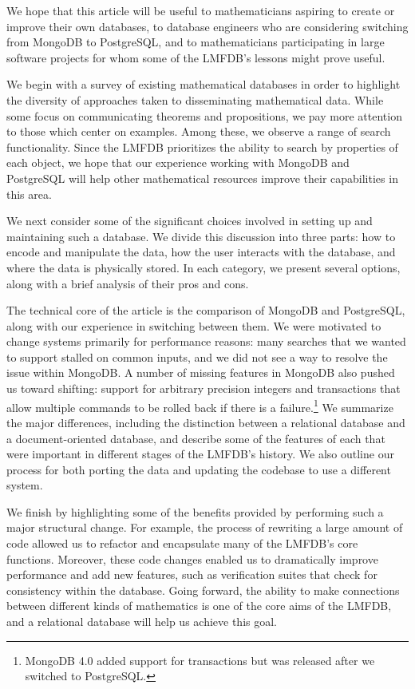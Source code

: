 \documentclass{amsart}
\begin{document}
We hope that this article will be useful to mathematicians aspiring to create or improve their own databases, to database engineers who are considering switching from MongoDB to PostgreSQL, and to mathematicians participating in large software projects for whom some of the LMFDB's lessons might prove useful.

We begin with a survey of existing mathematical databases in order to highlight the diversity of approaches taken to disseminating mathematical data.
While some focus on communicating theorems and propositions, we pay more attention to those which center on examples.
Among these, we observe a range of search functionality.
Since the LMFDB prioritizes the ability to search by properties of each object, we hope that our experience working with MongoDB and PostgreSQL will help other mathematical resources improve their capabilities in this area.

We next consider some of the significant choices involved in setting up and maintaining such a database.
We divide this discussion into three parts: how to encode and manipulate the data, how the user interacts with the database, and where the data is physically stored.
In each category, we present several options, along with a brief analysis of their pros and cons.

The technical core of the article is the comparison of MongoDB and PostgreSQL, along with our experience in switching between them.
We were motivated to change systems primarily for performance reasons: many searches that we wanted to support stalled on common inputs, and we did not see a way to resolve the issue within MongoDB.
A number of missing features in MongoDB also pushed us toward shifting: support for arbitrary precision integers and transactions that allow multiple commands to be rolled back if there is a failure.\footnote{MongoDB 4.0 added support for transactions but was released after we switched to PostgreSQL.}
We summarize the major differences, including the distinction between a relational database and a document-oriented database, and describe some of the features of each that were important in different stages of the LMFDB's history.
We also outline our process for both porting the data and updating the codebase to use a different system.

We finish by highlighting some of the benefits provided by performing such a major structural change.
For example, the process of rewriting a large amount of code allowed us to refactor and encapsulate many of the LMFDB's core functions.
Moreover, these code changes enabled us to dramatically improve performance and add new features, such as verification suites that check for consistency within the database.
Going forward, the ability to make connections between different kinds of mathematics is one of the core aims of the LMFDB, and a relational database will help us achieve this goal.
\end{document}
